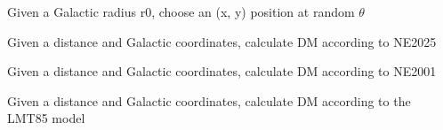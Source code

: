 \documentclass[letterpaper,10pt,english]{sphinxmanual}
\begin{document}

\begin{fulllineitems}
\label{\detokenize{module-level-docs:galacticops.calcXY}}
\pysigstartsignatures
\pysiglinewithargsret
{}
{}
{}
\pysigstopsignatures
\sphinxAtStartPar
Given a Galactic radius r0, choose an (x, y) position at random \(\theta\)

\end{fulllineitems}


\begin{fulllineitems}
\label{\detokenize{module-level-docs:galacticops.ne2025_dist_to_dm}}
\pysigstartsignatures
\pysiglinewithargsret
{}
{\sphinxparamcomma {}\sphinxparamcomma {}}
{}
\pysigstopsignatures
\sphinxAtStartPar
Given a distance and Galactic coordinates, calculate DM according to NE2025

\end{fulllineitems}


\begin{fulllineitems}
\label{\detokenize{module-level-docs:galacticops.ne2001_dist_to_dm}}
\pysigstartsignatures
\pysiglinewithargsret
{}
{\sphinxparamcomma {}\sphinxparamcomma {}}
{}
\pysigstopsignatures
\sphinxAtStartPar
Given a distance and Galactic coordinates, calculate DM according to NE2001

\end{fulllineitems}


\begin{fulllineitems}
\label{\detokenize{module-level-docs:galacticops.lmt85_dist_to_dm}}
\pysigstartsignatures
\pysiglinewithargsret
{}
{\sphinxparamcomma {}\sphinxparamcomma {}}
{}
\pysigstopsignatures
\sphinxAtStartPar
Given a distance and Galactic coordinates, calculate DM according to the LMT85 model

\end{fulllineitems}
\end{document}
